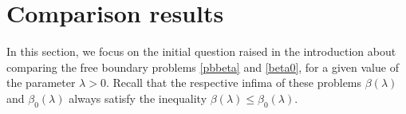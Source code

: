 \documentclass[reqno,11pt]{amsart}
\theoremstyle{definition}
\numberwithin{equation}{section}
\newcommand{\RR}{\mathbb{R}}
\newcommand{\1}{{{\bf 1}\kern-0,28em\rm l}}
\def\l{\lambda}
\begin{document}
%
%
%
%
%


\section{Comparison results} 
\label{secbb0}

In this section, we focus  on the initial question raised in the introduction about comparing the free boundary problems \eqref{pbbeta}
and \eqref{beta0}, for a given value of the parameter $\l>0$. Recall that  the respective infima of these problems
  $\beta(\lambda)$ and $\beta_0(\lambda)$ always satisfy the inequality $\beta(\l)\le \beta_0(\l)$.
\end{document}
